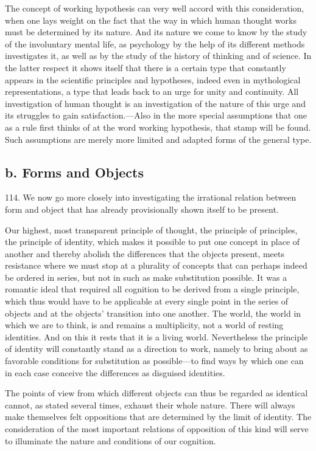 \documentclass[12pt,a4paper]{book}
\newcommand{\opage}[1]{\marginnote{\footnotesize\textit{[#1]}}}
\begin{document}
The concept of working hypothesis can very well accord with this consideration,
when one lays weight on the fact that the way in which human thought works must
be determined by its nature. And its nature we come to know by the study of the
involuntary mental life, as psychology by the help of its different methods
investigates it, as well as by the study of the history of thinking and of
science. In the latter respect it shows itself that there is a certain type
that constantly appears in the scientific principles and hypotheses, indeed even
in mythological representations, a type that leads back to an urge for unity and
continuity. All investigation of human thought is an investigation of the nature
of this urge and its struggles to gain satisfaction.---Also in the more special
assumptions that one as a rule first thinks of at the word working hypothesis,
that stamp will be found. Such assumptions are merely more limited and adapted
forms of the general type.

\subsection*{b. Forms and Objects}

\opage{274}114. We now go more closely into investigating the irrational relation
between form and object that has already provisionally shown itself to be
present.

Our highest, most transparent principle of thought, the principle of
principles, the principle of identity, which makes it possible to put one
concept in place of another and thereby abolish the differences that the
objects present, meets resistance where we must stop at a plurality of
concepts that can perhaps indeed be ordered in series, but not in such as
make substitution possible. It was a romantic ideal that required all
cognition to be derived from a single principle, which thus would have to be
applicable at every single point in the series of objects and at the objects'
transition into one another. The world, the world in which we are to think,
is and remains a multiplicity, not a world of resting identities. And on this
it rests that it is a living world. Nevertheless the principle of identity
will constantly stand as a direction to work, namely to bring about as
favorable conditions for substitution as possible---to find ways by which one
can in each case conceive the differences as disguised identities.

The points of view from which different objects can thus be regarded as
identical cannot, as stated several times, exhaust their whole nature. There
will always make themselves felt oppositions that are determined by the limit
of identity. The consideration of the most important relations of opposition
of this kind will serve to illuminate the nature and conditions of our
cognition.
\end{document}
